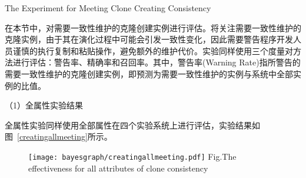 
{The Experiment for Meeting Clone Creating Consistency}

在本节中，对需要一致性维护的克隆创建实例进行评估。将关注需要一致性维护的克隆实例，由于其在演化过程中可能会引发一致性变化，因此需要警告程序开发人员谨慎的执行复制和粘贴操作，避免额外的维护代价。实验同样使用三个度量对方法进行评估：警告率、精确率和召回率。其中，警告率(Warning Rate)指所警告的需要一致性维护的克隆创建实例，即预测为需要一致性维护的实例与系统中全部实例的比值。


（1）全属性实验结果

全属性实验同样使用全部属性在四个实验系统上进行评估，实验结果如图~\ref{creatingallmeeting}所示。

\begin{figure}[htbp]
\centering
\texttt{[image: bayesgraph/creatingallmeeting.pdf]}
{Fig.$\!$}{The effectiveness for all attributes of clone consistency}
\vspace{-1em}
\end{figure}

